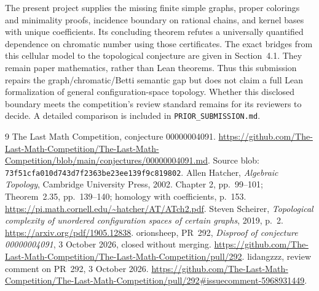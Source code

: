 \documentclass[11pt]{article}
\begin{document}
The present project supplies the missing finite simple graphs, proper
colorings and minimality proofs, incidence boundary on rational chains,
and kernel bases with unique coefficients. Its concluding theorem refutes
a universally quantified dependence on chromatic number using those
certificates. The exact bridges from this cellular model to the topological
conjecture are given in Section~4.1. They remain paper mathematics, rather
than Lean theorems. Thus this submission repairs the graph/chromatic/Betti
semantic gap but does not claim a full Lean formalization of general
configuration-space topology. Whether this disclosed boundary meets the
competition's review standard remains for its reviewers to decide.
A detailed comparison is included in \texttt{PRIOR\_SUBMISSION.md}.

\clearpage
\begin{thebibliography}{9}
The Last Math Competition, conjecture 00000004091.
\url{https://github.com/The-Last-Math-Competition/The-Last-Math-Competition/blob/main/conjectures/00000004091.md}.
Source blob: \texttt{73f51cfa010d743d7f2363be23ee139f9c819802}.
Allen Hatcher, \emph{Algebraic Topology}, Cambridge University Press, 2002.
Chapter 2, pp.~99--101; Theorem~2.35, pp.~139--140; homology with
coefficients, p.~153.
\url{https://pi.math.cornell.edu/~hatcher/AT/ATch2.pdf}.
Steven Scheirer, \emph{Topological complexity of unordered configuration
spaces of certain graphs}, 2019, p.~2.
\url{https://arxiv.org/pdf/1905.12838}.
orionsheep, PR~292, \emph{Disproof of conjecture 00000004091},
3 October 2026, closed without merging.
\url{https://github.com/The-Last-Math-Competition/The-Last-Math-Competition/pull/292}.
lidangzzz, review comment on PR~292, 3 October 2026.
\url{https://github.com/The-Last-Math-Competition/The-Last-Math-Competition/pull/292#issuecomment-5968931449}.
\end{thebibliography}
\end{document}
